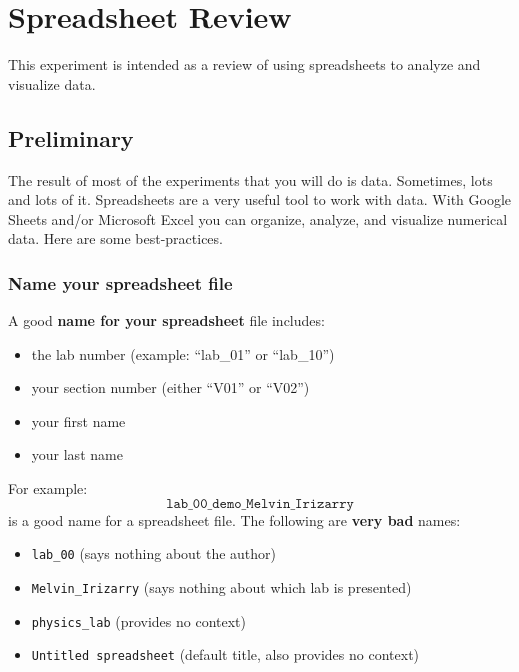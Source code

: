 \setcounter{chapter}{-1}
\chapter{Spreadsheet Review}
This experiment is intended as a review of using spreadsheets to analyze and visualize data.
\section{Preliminary}
The result of most of the experiments that you will do is data. Sometimes, lots and lots of it. Spreadsheets are a very useful tool to work with data. With Google Sheets and/or Microsoft Excel you can organize, analyze, and visualize numerical data. Here are some best-practices.
\subsection{Name your spreadsheet file}
A good \textbf{name for your spreadsheet} file includes:
\begin{itemize}
    \item the lab number (example: ``lab\_01'' or ``lab\_10'')
    \item your section number (either ``V01'' or ``V02'')
    \item your first name
    \item your last name
\end{itemize}
For example:
\begin{equation}
    \texttt{lab\_00\_demo\_Melvin\_Irizarry}
\end{equation}
is a good name for a spreadsheet file. The following are \textbf{very bad} names:
\begin{itemize}
    \item \texttt{lab\_00} (says nothing about the author)
    \item \texttt{Melvin\_Irizarry} (says nothing about which lab is presented)
    \item \texttt{physics\_lab} (provides no context)
    \item \texttt{Untitled spreadsheet} (default title, also provides no context)
\end{itemize}
